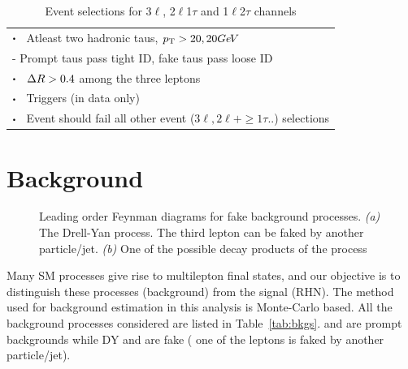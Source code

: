 \documentclass[letterpaper,12pt]{article}
\newcommand\sbullet[1][.5]{\mathbin{\vcenter{\hbox{\scalebox{#1}{$\bullet$}}}}}  %
\newcommand{\GeV}{{Ge\kern -0.1em V}}
\begin{document}
\begin{table}
{\begin{tabular}{l}
    $\sbullet \hspace{0.2cm}$ Atleast two hadronic taus, $\pt>20,20 \GeV$\\
    \hspace{1cm}- Prompt taus pass tight ID, fake taus pass loose ID\\
    $\sbullet \hspace{0.2cm}$ $\Delta R>0.4$ among the three leptons\\
    $\sbullet \hspace{0.2cm}$ Triggers (in data only)\\
    $\sbullet \hspace{0.2cm}$ Event should fail all other event ($3\ell,2\ell+\geq1\tau..$) selections\\
    \hline \hline
    \end{tabular}%
  }
  \caption{Event selections for 3$\ell$, 2$\ell$1$\tau$ and 1$\ell$2$\tau$ channels}
  \label{tab:eventsel}
\end{table}

\section{Background}
\label{sec:bkgs}

\begin{figure}
  \begin{adjustbox}{minipage=\textwidth, scale=0.75}
    \centering
    \qquad
    \caption[Feynman diagrams for background processes]{\normalsize{Leading order Feynman diagrams for fake background processes. \emph{(a)} The Drell-Yan process. The third lepton can be faked by another particle/jet. \emph{(b)} One of the possible decay products of the \ttbar{} process}}
    \label{fig:bkgsfeyn}
  \end{adjustbox}
\end{figure}
Many SM processes give rise to multilepton final states, and our objective is to distinguish these processes (background) from the signal (RHN). The method used for background estimation in this analysis is Monte-Carlo based. All the background processes considered are listed in Table~\ref{tab:bkgs}. \WZ{} and \ZZ{} are prompt backgrounds while DY and \ttbar{} are fake (\ie{} one of the leptons is faked by another particle/jet).   
\end{document}
